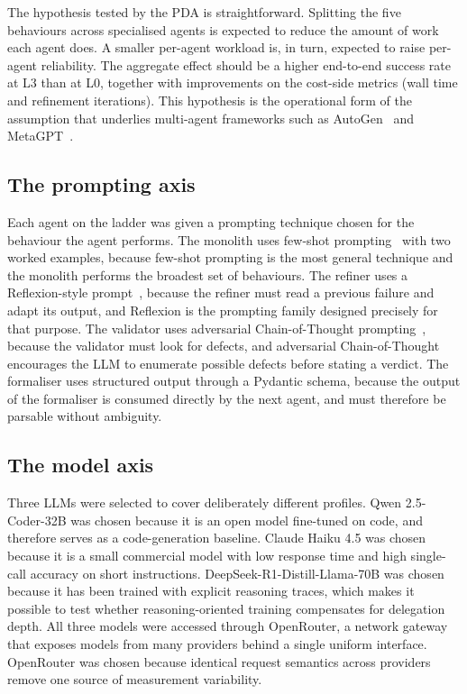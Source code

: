 \documentclass[11pt,a4paper]{article}
\begin{document}
The hypothesis tested by the PDA is straightforward. Splitting the five behaviours across specialised agents is expected to reduce the amount of work each agent does. A smaller per-agent workload is, in turn, expected to raise per-agent reliability. The aggregate effect should be a higher end-to-end success rate at L3 than at L0, together with improvements on the cost-side metrics (wall time and refinement iterations). This hypothesis is the operational form of the assumption that underlies multi-agent frameworks such as AutoGen~\cite{R5} and MetaGPT~\cite{R6}.

\subsection{The prompting axis}\label{sec:method:prompt}
Each agent on the ladder was given a prompting technique chosen for the behaviour the agent performs. The monolith uses few-shot prompting~\cite{R3} with two worked examples, because few-shot prompting is the most general technique and the monolith performs the broadest set of behaviours. The refiner uses a Reflexion-style prompt~\cite{R4}, because the refiner must read a previous failure and adapt its output, and Reflexion is the prompting family designed precisely for that purpose. The validator uses adversarial Chain-of-Thought prompting~\cite{R3}, because the validator must look for defects, and adversarial Chain-of-Thought encourages the LLM to enumerate possible defects before stating a verdict. The formaliser uses structured output through a Pydantic schema, because the output of the formaliser is consumed directly by the next agent, and must therefore be parsable without ambiguity.

\subsection{The model axis}\label{sec:method:models}
Three LLMs were selected to cover deliberately different profiles. Qwen 2.5-Coder-32B was chosen because it is an open model fine-tuned on code, and therefore serves as a code-generation baseline. Claude Haiku 4.5 was chosen because it is a small commercial model with low response time and high single-call accuracy on short instructions. DeepSeek-R1-Distill-Llama-70B was chosen because it has been trained with explicit reasoning traces, which makes it possible to test whether reasoning-oriented training compensates for delegation depth. All three models were accessed through OpenRouter, a network gateway that exposes models from many providers behind a single uniform interface. OpenRouter was chosen because identical request semantics across providers remove one source of measurement variability.
\end{document}
